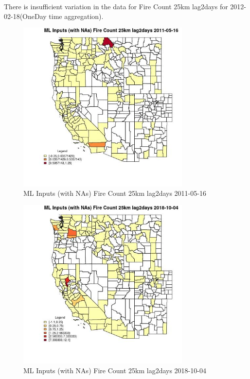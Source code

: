 There is insufficient variation in the data for Fire Count 25km lag2days for 2012-02-18(OneDay time aggregation). 
 

\begin{figure} 
\centering  
\includegraphics[width=0.77\textwidth]{Code_Outputs/Report_ML_input_PM25_Step4_part_f_de_duplicated_aveswNAs_CountyFire_Count_25km_lag2daysMean2011-05-16.jpg} 
\caption{\label{fig:Report_ML_input_PM25_Step4_part_f_de_duplicated_aveswNAsCountyFire_Count_25km_lag2daysMean2011-05-16}ML Inputs (with NAs) Fire Count 25km lag2days 2011-05-16} 
\end{figure} 
 

\begin{figure} 
\centering  
\includegraphics[width=0.77\textwidth]{Code_Outputs/Report_ML_input_PM25_Step4_part_f_de_duplicated_aveswNAs_CountyFire_Count_25km_lag2daysMean2018-10-04.jpg} 
\caption{\label{fig:Report_ML_input_PM25_Step4_part_f_de_duplicated_aveswNAsCountyFire_Count_25km_lag2daysMean2018-10-04}ML Inputs (with NAs) Fire Count 25km lag2days 2018-10-04} 
\end{figure} 
 

